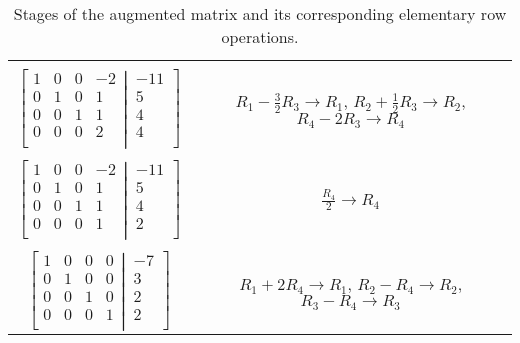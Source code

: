 \documentclass{article}
\begin{document}
\begin{table}[h]
\begin{tabular}{c|c}
\\
\\

$\left[
  \begin{matrix}
    1 & 0 & 0 & -2\\  
 0 & 1 & 0 & 1 \\
 0 & 0 & 1 & 1\\
 0 & 0 & 0 & 2 \\
  \end{matrix}
  \left|
    \,
    \begin{matrix}
      -11  \\
      5  \\
      4  \\
      4  \\
    \end{matrix}
  \right.
\right]$ & $R_{1} - \frac{3}{2}R_{3}  \rightarrow R_{1}$, 	 $R_{2} + \frac{1}{2}R_{3}  \rightarrow R_{2}$, 	$R_{4} - 2R_{3}  \rightarrow R_{4}$

\\
\\

$\left[
  \begin{matrix}
    1 & 0 & 0 & -2\\  
 0 & 1 & 0 & 1 \\
 0 & 0 & 1 & 1\\
 0 & 0 & 0 & 1 \\
  \end{matrix}
  \left|
    \,
    \begin{matrix}
      -11  \\
      5  \\
      4  \\
      2  \\
    \end{matrix}
  \right.
\right]$ & $\frac{R_{4}}{2}  \rightarrow R_{4}$

\\
\\

$\left[
  \begin{matrix}
    1 & 0 & 0 & 0\\  
 0 & 1 & 0 & 0 \\
 0 & 0 & 1 & 0\\
 0 & 0 & 0 & 1 \\
  \end{matrix}
  \left|
    \,
    \begin{matrix}
      -7  \\
      3  \\
      2  \\
      2  \\
    \end{matrix}
  \right.
\right]$ & $R_{1} + 2R_{4}  \rightarrow R_{1}$, $R_{2} - R_{4}  \rightarrow R_{2}$, 	$R_{3} - R_{4}  \rightarrow R_{3}$

    \end{tabular}
    \caption{Stages of the augmented matrix and its corresponding elementary row operations.}
   \end{table}
   
\end{document}
